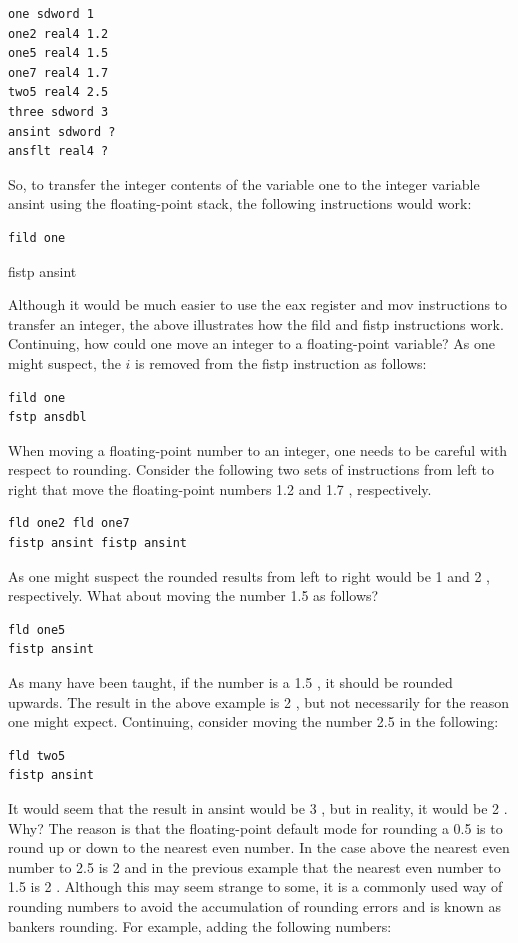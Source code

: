 \documentclass[10pt]{article}
\begin{document}
\begin{verbatim}
one sdword 1
one2 real4 1.2
one5 real4 1.5
one7 real4 1.7
two5 real4 2.5
three sdword 3
ansint sdword ?
ansflt real4 ?
\end{verbatim}

So, to transfer the integer contents of the variable one to the integer variable ansint using the floating-point stack, the following instructions would work:

\begin{verbatim}
fild one
\end{verbatim}

fistp ansint

Although it would be much easier to use the eax register and mov instructions to transfer an integer, the above illustrates how the fild and fistp instructions work. Continuing, how could one move an integer to a floating-point variable? As one might suspect, the $i$ is removed from the fistp instruction as follows:

\begin{verbatim}
fild one
fstp ansdbl
\end{verbatim}

When moving a floating-point number to an integer, one needs to be careful with respect to rounding. Consider the following two sets of instructions from left to right that move the floating-point numbers 1.2 and 1.7 , respectively.

\begin{verbatim}
fld one2 fld one7
fistp ansint fistp ansint
\end{verbatim}

As one might suspect the rounded results from left to right would be 1 and 2 , respectively. What about moving the number 1.5 as follows?

\begin{verbatim}
fld one5
fistp ansint
\end{verbatim}

As many have been taught, if the number is a 1.5 , it should be rounded upwards. The result in the above example is 2 , but not necessarily for the reason one might expect. Continuing, consider moving the number 2.5 in the following:

\begin{verbatim}
fld two5
fistp ansint
\end{verbatim}

It would seem that the result in ansint would be 3 , but in reality, it would be 2 . Why? The reason is that the floating-point default mode for rounding a 0.5 is to round up or down to the nearest even number. In the case above the nearest even number to 2.5 is 2 and in the previous example that the nearest even number to 1.5 is 2 . Although this may seem strange to some, it is a commonly used way of rounding numbers to avoid the accumulation of rounding errors and is known as bankers rounding. For example, adding the following numbers:
\end{document}
